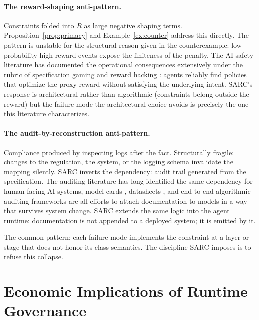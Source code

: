 \documentclass[11pt,a4paper]{article}
\theoremstyle{remark}
\begin{document}
\paragraph{The reward-shaping anti-pattern.} Constraints folded into $R$ as large negative shaping terms. Proposition~\ref{prop:primacy} and Example~\ref{ex:counter} address this directly. The pattern is unstable for the structural reason given in the counterexample: low-probability high-reward events expose the finiteness of the penalty. The AI-safety literature has documented the operational consequences extensively under the rubric of specification gaming and reward hacking \cite{amodei2016concrete,leike2017gridworlds,krakovna2020specgaming,skalse2022rewardhacking,hendrycks2021unsolved}: agents reliably find policies that optimize the proxy reward without satisfying the underlying intent. SARC's response is architectural rather than algorithmic (constraints belong outside the reward) but the failure mode the architectural choice avoids is precisely the one this literature characterizes.

\paragraph{The audit-by-reconstruction anti-pattern.} Compliance produced by inspecting logs after the fact. Structurally fragile: changes to the regulation, the system, or the logging schema invalidate the mapping silently. SARC inverts the dependency: audit trail generated from the specification. The auditing literature has long identified the same dependency for human-facing AI systems, model cards \cite{mitchell2019modelcards}, datasheets \cite{gebru2021datasheets}, and end-to-end algorithmic auditing frameworks \cite{raji2020closing,raji2022outsider} are all efforts to attach documentation to models in a way that survives system change. SARC extends the same logic into the agent runtime: documentation is not appended to a deployed system; it is emitted by it.

The common pattern: each failure mode implements the constraint at a layer or stage that does not honor its class semantics. The discipline SARC imposes is to refuse this collapse.

\section{Economic Implications of Runtime Governance}\label{sec:economic}
\end{document}
